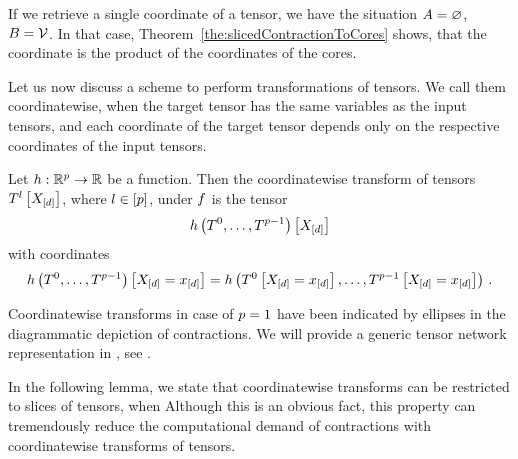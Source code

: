 If we retrieve a single coordinate of a tensor, we have the situation $A=\varnothing$, $B=\mathcal{V}$.
In that case, Theorem~\ref{the:slicedContractionToCores} shows, that the coordinate is the product of the coordinates of the cores. %

\label{sec:coordinatewiseTransforms}

Let us now discuss a scheme to perform transformations of tensors.
We call them coordinatewise, when the target tensor has the same variables as the input tensors, and each coordinate of the target tensor depends only on the respective coordinates of the input tensors. %

\begin{definition}
    \label{def:coordinatewiseTransform}
    Let $h: \mathbb{R}^{p} \rightarrow \mathbb{R}$ be a function.
    Then the coordinatewise transform of tensors $T^{l}\left[X_{[d]}\right]$, where $l\in[p]$, under $f$ is the tensor
    \begin{align*}
        {h}\left(T^{0},\ldots,T^{p-1}\right)\left[X_{[d]}\right]
    \end{align*}
    with coordinates
    \begin{align*}
        {h}\left(T^{0},\ldots,T^{p-1}\right)\left[X_{[d]}=x_{[d]}\right]
        = h\left(T^{0}\left[X_{[d]}=x_{[d]}\right],\ldots,T^{p-1}\left[X_{[d]}=x_{[d]}\right]\right) \, .
    \end{align*}
\end{definition}

Coordinatewise transforms in case of $p=1$ have been indicated by ellipses in the diagrammatic depiction of contractions.
We will provide a generic tensor network representation in , see .


In the following lemma, we state that coordinatewise transforms can be restricted to slices of tensors, when
Although this is an obvious fact, this property can tremendously reduce the computational demand of contractions with coordinatewise transforms of tensors.

